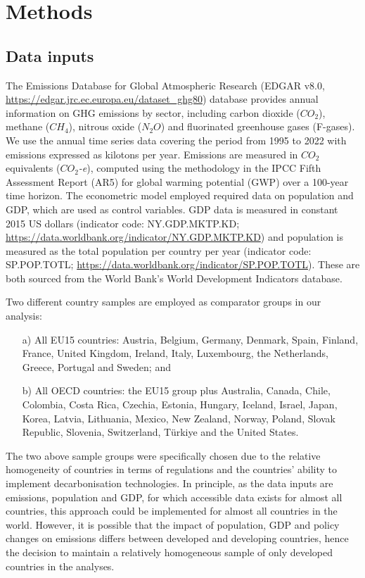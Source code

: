 \documentclass[a4paper]{article}
\begin{document}
\section*{Methods}

\subsection*{Data inputs}\label{subsec:data}

The Emissions Database for Global Atmospheric Research (EDGAR v8.0,
\url{https://edgar.jrc.ec.europa.eu/dataset_ghg80}) database \cite{EDGAR_8} provides annual information on GHG emissions by sector, including carbon dioxide ($CO_2$), methane ($CH_4$), nitrous oxide ($N_2O$) and fluorinated greenhouse gases (F-gases). We use the annual time series data covering the period from 1995 to 2022 with emissions expressed as kilotons per year. Emissions are measured in $CO_2$ equivalents ($CO_2$\textit{-e}), computed using the methodology in the IPCC Fifth Assessment Report (AR5) for global warming potential (GWP) over a 100-year time horizon. \cite{IPCC2014} The econometric model employed required data on population and GDP, which are used as control variables. GDP data is measured in constant 2015 US dollars (indicator code: NY.GDP.MKTP.KD; \url{https://data.worldbank.org/indicator/NY.GDP.MKTP.KD}) and population is measured as the total population per country per year (indicator code: SP.POP.TOTL; \url{https://data.worldbank.org/indicator/SP.POP.TOTL}). These are both sourced from the World Bank's World Development Indicators database. \cite{WB_GDP, WB_pop}

Two different country samples are employed as comparator groups in our analysis:
\begin{enumerate}
    \item[a)] All EU15 countries: Austria, Belgium, Germany, Denmark, Spain, Finland, France, United Kingdom, Ireland, Italy, Luxembourg, the Netherlands, Greece, Portugal and Sweden; and
    \item[b)] All OECD countries: the EU15 group plus Australia, Canada, Chile, Colombia, Costa Rica, Czechia, Estonia, Hungary, Iceland, Israel, Japan, Korea, Latvia, Lithuania, Mexico, New Zealand, Norway, Poland, Slovak Republic, Slovenia, Switzerland, Türkiye and the United States.
\end{enumerate}

The two above sample groups were specifically chosen due to the relative homogeneity of countries in terms of regulations and the countries' ability to implement decarbonisation technologies. In principle, as the data inputs are emissions, population and GDP, for which accessible data exists for almost all countries, this approach could be implemented for almost all countries in the world. However, it is possible that the impact of population, GDP and policy changes on emissions differs between developed and developing countries, hence the decision to maintain a relatively homogeneous sample of only developed countries in the analyses.
\end{document}
